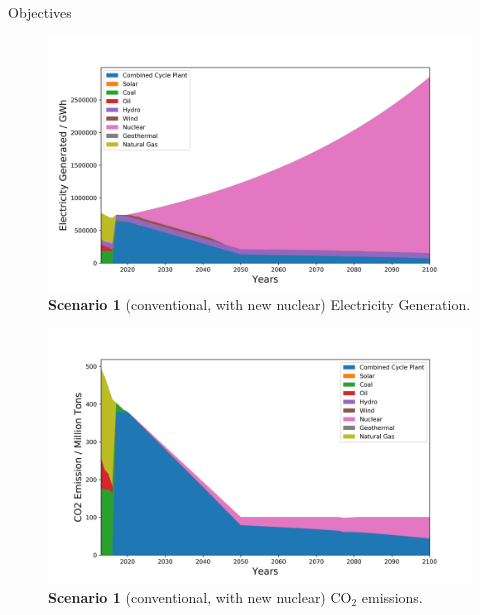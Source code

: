 \documentclass[final]{beamer}
\newlength{\onecolwid}
\begin{document}
\begin{frame}[t]
\begin{columns}
\begin{column}{\onecolwid}
\begin{alertblock}{Objectives}
\end{alertblock}
%
%


\begin{figure}[H] 
\centering
\includegraphics[scale=1.1]{./plots/convNuc_ele.png}
\caption{\textbf{Scenario 1} (conventional, with new nuclear) Electricity Generation.}
\label{s1e}
\end{figure}

\begin{figure}[H] 
\centering
\includegraphics[scale=1.1]{./plots/convNuc_co2.png}
\caption{\textbf{Scenario 1} (conventional, with new nuclear) CO$_2$ emissions.}
\label{s1c}
\end{figure}



\end{column}
\end{columns}
\end{frame}
\end{document}
